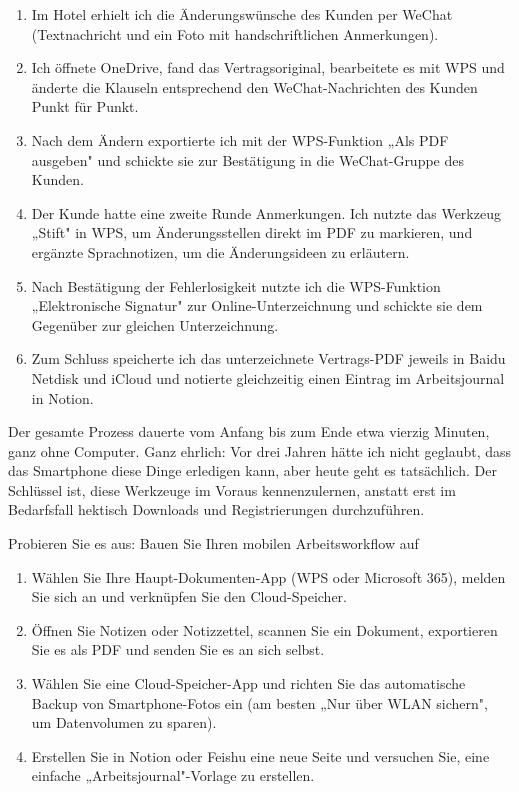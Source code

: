 \begin{enumerate}
  \item Im Hotel erhielt ich die Änderungswünsche des Kunden per WeChat (Textnachricht und ein Foto mit handschriftlichen Anmerkungen).
  \item Ich öffnete OneDrive, fand das Vertragsoriginal, bearbeitete es mit WPS und änderte die Klauseln entsprechend den WeChat-Nachrichten des Kunden Punkt für Punkt.
  \item Nach dem Ändern exportierte ich mit der WPS-Funktion „Als PDF ausgeben" und schickte sie zur Bestätigung in die WeChat-Gruppe des Kunden.
  \item Der Kunde hatte eine zweite Runde Anmerkungen. Ich nutzte das Werkzeug „Stift" in WPS, um Änderungsstellen direkt im PDF zu markieren, und ergänzte Sprachnotizen, um die Änderungsideen zu erläutern.
  \item Nach Bestätigung der Fehlerlosigkeit nutzte ich die WPS-Funktion „Elektronische Signatur" zur Online-Unterzeichnung und schickte sie dem Gegenüber zur gleichen Unterzeichnung.
  \item Zum Schluss speicherte ich das unterzeichnete Vertrags-PDF jeweils in Baidu Netdisk und iCloud und notierte gleichzeitig einen Eintrag im Arbeitsjournal in Notion.
\end{enumerate}

Der gesamte Prozess dauerte vom Anfang bis zum Ende etwa vierzig Minuten, ganz ohne Computer. Ganz ehrlich: Vor drei Jahren hätte ich nicht geglaubt, dass das Smartphone diese Dinge erledigen kann, aber heute geht es tatsächlich. Der Schlüssel ist, diese Werkzeuge im Voraus kennenzulernen, anstatt erst im Bedarfsfall hektisch Downloads und Registrierungen durchzuführen.

\begin{tcbpractice}{Probieren Sie es aus: Bauen Sie Ihren mobilen Arbeitsworkflow auf}
\begin{enumerate}
  \item Wählen Sie Ihre Haupt-Dokumenten-App (WPS oder Microsoft 365), melden Sie sich an und verknüpfen Sie den Cloud-Speicher.
  \item Öffnen Sie Notizen oder Notizzettel, scannen Sie ein Dokument, exportieren Sie es als PDF und senden Sie es an sich selbst.
  \item Wählen Sie eine Cloud-Speicher-App und richten Sie das automatische Backup von Smartphone-Fotos ein (am besten „Nur über WLAN sichern", um Datenvolumen zu sparen).
  \item Erstellen Sie in Notion oder Feishu eine neue Seite und versuchen Sie, eine einfache „Arbeitsjournal"-Vorlage zu erstellen.
\end{enumerate}

\end{tcbpractice}
